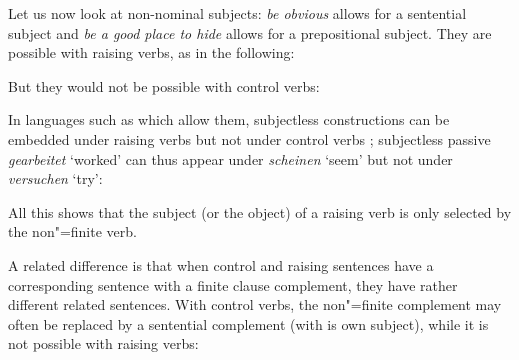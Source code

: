 \documentclass[output=paper
	        ,collection
	        ,collectionchapter
 	        ,biblatex
                ,babelshorthands
                ,newtxmath
                ,draftmode
                ,colorlinks, citecolor=brown
]{langscibook}
\begin{document}
\eal
\judgewidth{\#}
 \label{cat1}
 \label{cat2}
 \label{cat3}
 \label{cat4}
\zl

Let us now look at non-nominal subjects: \emph{be obvious} allows for a sentential subject and
\emph{be a good place to hide} allows for a prepositional subject. They are possible with raising
verbs, as in the following: 
 
\eal 
{}
 \label{under}
\zl

\noindent
But they would not be possible with control verbs:
\eal
{}
\zl

In languages such as  which allow them, subjectless constructions can be embedded under
raising verbs but not under control verbs \citep[]{Mueller2002b}; subjectless passive
\emph{gearbeitet} `worked' can thus appear under \emph{scheinen} `seem' but not under
\emph{versuchen} `try': 

\eal
\label{german1}
\zl
 
\noindent
All this shows that the subject (or the object) of a raising verb is only selected by the
non"=finite verb.

A related difference is that when control and raising sentences have a corresponding sentence with a finite clause complement, they have rather different related sentences.
With control verbs, the non"=finite complement may often be replaced by a sentential complement (with is own subject), while it is not possible with raising verbs:
\end{document}
